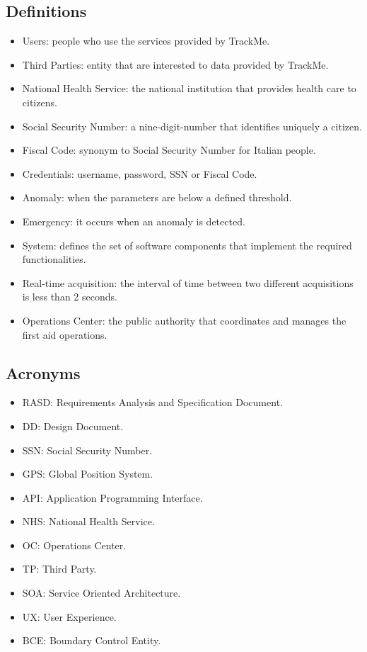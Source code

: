 \subsection{Definitions}
\begin{itemize}
    \item Users: people who use the services provided by TrackMe.
    \item Third Parties: entity that are interested to data provided by TrackMe.
    \item National Health Service: the national institution that provides health care to citizens.
    \item Social Security Number: a nine-digit-number that identifies uniquely a citizen.
    \item Fiscal Code: synonym to Social Security Number for Italian people.
    \item Credentials: username, password, SSN or Fiscal Code.
    \item Anomaly: when the parameters are below a defined threshold. 
    \item Emergency: it occurs when an anomaly is detected.
    \item System: defines the set of software components that implement the required functionalities.
    \item Real-time acquisition: the interval of time between two different acquisitions is less than 2 seconds.
    \item Operations Center: the public authority that coordinates and manages the first aid operations.
\end{itemize}

\subsection{Acronyms}
\begin{itemize}
    \item RASD: Requirements Analysis and Specification Document. 
    \item DD: Design Document.
    \item SSN: Social Security Number.
    \item GPS: Global Position System.
    \item API: Application Programming Interface.
    \item NHS: National Health Service.
    \item OC: Operations Center.
    \item TP: Third Party.
    \item SOA: Service Oriented Architecture.
    \item UX: User Experience.
    \item BCE: Boundary Control Entity.
\end{itemize}

